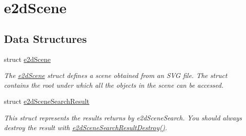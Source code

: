\hypertarget{group__e2dScene}{\section{e2d\-Scene}
\label{group__e2dScene}
}
\subsection*{Data Structures}
\begin{DoxyCompactItemize}
\item 
struct \hyperlink{structe2dScene}{e2d\-Scene}
\begin{DoxyCompactList}\small\item\em The \hyperlink{structe2dScene}{e2d\-Scene} struct defines a scene obtained from an S\-V\-G file. The struct contains the root under which all the objects in the scene can be accessed. \end{DoxyCompactList}\item 
struct \hyperlink{structe2dSceneSearchResult}{e2d\-Scene\-Search\-Result}
\begin{DoxyCompactList}\small\item\em This struct represents the results returns by e2d\-Scene\-Search. You should always destroy the result with \hyperlink{group__e2dScene_ga0eedd7c50a3d65e91abd54fcee3de39d}{e2d\-Scene\-Search\-Result\-Destroy()}. \end{DoxyCompactList}\end{DoxyCompactItemize}
